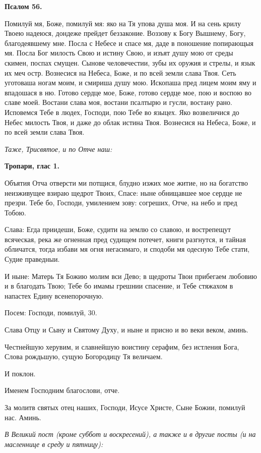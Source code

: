 \medskip


\bfseries Псалом 56.\normalfont{}


Помилуй мя, Боже, помилуй мя: яко на Тя упова душа моя. И на сень крилу Твоею надеюся, дондеже прейдет беззаконие. Воззову к Богу Вышнему, Богу, благодеявшему мне. Посла с Небесе и спасе мя, даде в поношение попирающыя мя. Посла Бог милость Свою и истину Свою, и изъят душу мою от среды скимен, поспах смущен. Сынове человечестии, зубы их оружия и стрелы, и язык их меч остр. Вознесися на Небеса, Боже, и по всей земли слава Твоя. Сеть уготоваша ногам моим, и смириша душу мою. Ископаша пред лицем моим яму и впадошася в ню. Готово сердце мое, Боже, готово сердце мое, пою и воспою во славе моей. Востани слава моя, востани псалтырю и гусли, востану рано. Исповемся Тебе в людех, Господи, пою Тебе во языцех. Яко возвеличися до Небес милость Твоя, и даже до облак истина Твоя. Вознесися на Небеса, Боже, и по всей земли слава Твоя.


\itshape Таже, Трисвятое, и по Отче наш:\normalfont{}


\medskip


\bfseries Тропари, глас 1.\normalfont{}


Объятия Отча отверсти ми потщися, блудно изжих мое житие, но на богатство неизживущее взираю щедрот Твоих, Спасе: ныне обнищавшее мое сердце не презри. Тебе бо, Господи, умилением зову: согреших, Отче, на небо и пред Тобою.


Слава: Егда приидеши, Боже, судити на землю со славою, и вострепещут всяческая, река же огненная пред судищем потечет, книги разгнутся, и тайная обличатся, тогда избави мя огня негасимаго, и сподоби мя одесную Тебе стати, Судие праведныи.


И ныне: Матерь Тя Божию молим вси Дево; в щедроты Твои прибегаем любовию и в благодать Твою; Тебе бо имамы грешнии спасение, и Тебе стяжахом в напастех Едину всенепорочную.


Посем: Господи, помилуй, 30.

Слава Отцу и Сыну и Святому Духу, и ныне и присно и во веки веком, аминь.

Честнейшую херувим, и славнейшую воистину серафим, без истления Бога, Слова рождьшую, сущую Богородицу Тя величаем.

И поклон.

Именем Господним благослови, отче.

За молитв святых отец наших, Господи, Исусе Христе, Сыне Божии, помилуй нас. Аминь.


\itshape В Великий пост (кроме суббот и воскресений), а также и в другие посты (и на масленнице в среду и пятницу):\normalfont{}


